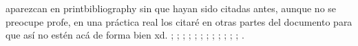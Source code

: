 \documentclass[12pt,letterpaper]{article}
\begin{document}
aparezcan en printbibliography sin que hayan sido citadas antes, aunque no se preocupe profe, en una práctica real los citaré en otras partes del documento para que así no estén acá de forma bien xd. \cite{Articulo}; \cite{Ariculo_de_memorias_de_un_congreso}; \cite{Cuando_el_resto_falla}; \cite{Documentacion_tecnica}; \cite{Documento_inedito_o_no_formalmente_publicado}; \cite{Informe_publicado_por_una_institucion}; \cite{Libro_con_editorial}; \cite{Libro_sin_editorial}; \cite{Parte_de_un_libro}; \cite{Tesis_de_maestria}; \cite{Tesis_de_doctorado}; \cite{Memorias_De_un_congreso}; \cite{Parte_cap_propio_de_un_libro}.

\printbibliography
\end{document}
